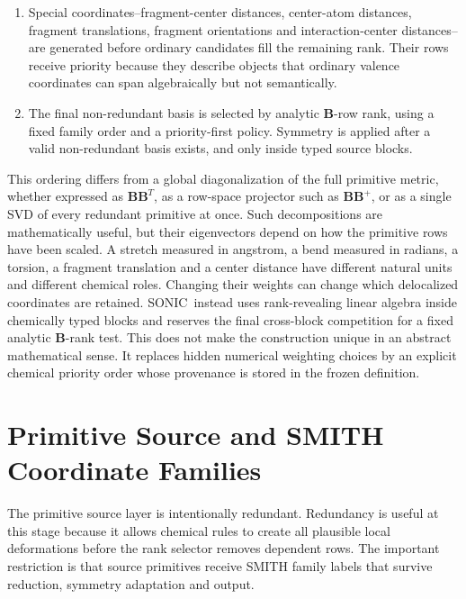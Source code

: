 \documentclass[journal=jctcce,manuscript=article,layout=traditional]{achemso}
\newcommand{\SONIC}{SONIC}
\newcommand{\Bmat}{\mathbf{B}}
\theoremstyle{definition}
\begin{document}
\begin{enumerate}
including butterfly coordinates around bonds shared by two rings.  These rows
remain in ring/torsional source blocks during reduction and symmetry
adaptation; they are not relabelled as generic torsions.
\item Special coordinates--fragment-center distances, center-atom distances,
fragment translations, fragment orientations and interaction-center distances--
are generated before ordinary candidates fill the remaining rank.  Their rows
receive priority because they describe objects that ordinary valence coordinates
can span algebraically but not semantically.
\item The final non-redundant basis is selected by analytic \(\Bmat\)-row rank,
using a fixed family order and a priority-first policy.  Symmetry is applied
after a valid non-redundant basis exists, and only inside typed source
blocks.
\end{enumerate}

This ordering differs from a global diagonalization of the full primitive
metric, whether expressed as \( \Bmat \Bmat^T \), as a row-space projector such
as \( \Bmat \Bmat^+ \), or as a single SVD of every redundant primitive at
once.  Such decompositions are mathematically useful, but their eigenvectors
depend on how the primitive rows have been scaled.  A stretch measured in
angstrom, a bend measured in radians, a torsion, a fragment translation and a
center distance have different natural units and different chemical roles.
Changing their weights can change which delocalized coordinates are retained.
\SONIC\ instead uses rank-revealing linear algebra inside chemically typed
blocks and reserves the final cross-block competition for a fixed
analytic \(\Bmat\)-rank test.  This does not make the construction unique in an
abstract mathematical sense.  It replaces hidden numerical weighting choices by
an explicit chemical priority order whose provenance is stored in the frozen
definition.

\section{Primitive Source and SMITH Coordinate Families}

The primitive source layer is intentionally redundant.  Redundancy is useful at this
stage because it allows chemical rules to create all plausible local
deformations before the rank selector removes dependent rows.  The important
restriction is that source primitives receive SMITH family labels that survive
reduction, symmetry adaptation and output.
\end{document}
